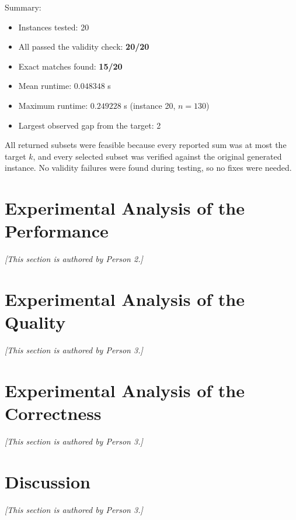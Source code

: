 \documentclass[12pt,a4paper]{article}
\theoremstyle{definition}
\begin{document}
\noindent Summary:

\begin{itemize}[noitemsep]
  \item Instances tested: 20
  \item All passed the validity check: \textbf{20/20}
  \item Exact matches found: \textbf{15/20}
  \item Mean runtime: \(0.048348\) s
  \item Maximum runtime: \(0.249228\) s (instance 20, \(n = 130\))
  \item Largest observed gap from the target: 2
\end{itemize}

All returned subsets were feasible because every reported sum was at most the target
\(k\), and every selected subset was verified against the original generated instance.
No validity failures were found during testing, so no fixes were needed.



\section{Experimental Analysis of the Performance}
\textit{[This section is authored by Person 2.]}

\section{Experimental Analysis of the Quality}
\textit{[This section is authored by Person 3.]}

\section{Experimental Analysis of the Correctness}
\textit{[This section is authored by Person 3.]}

\section{Discussion}
\textit{[This section is authored by Person 3.]}
\end{document}
